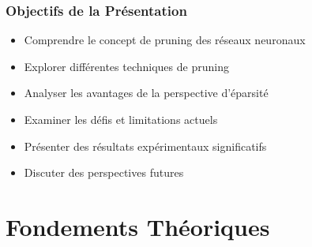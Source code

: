 \documentclass[10pt]{beamer}
\begin{document}
\begin{frame}
\frametitle{Objectifs de la Présentation}
\begin{itemize}
    \item Comprendre le concept de pruning des réseaux neuronaux
    \item Explorer différentes techniques de pruning
    \item Analyser les avantages de la perspective d'éparsité 
    \item Examiner les défis et limitations actuels
    \item Présenter des résultats expérimentaux significatifs
    \item Discuter des perspectives futures
\end{itemize}
\end{frame}

\section{Fondements Théoriques}
\end{document}
